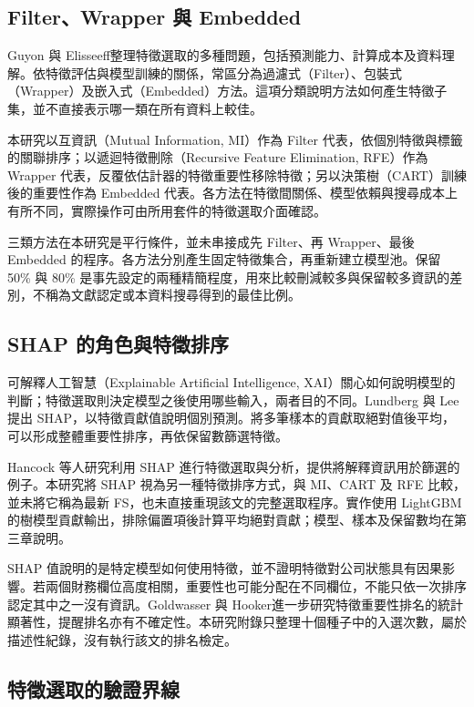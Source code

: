 \subsection{Filter、Wrapper 與 Embedded}

Guyon 與 Elisseeff\autocite{guyon2003selection}整理特徵選取的多種問題，包括預測能力、計算成本及資料理解。依特徵評估與模型訓練的關係，常區分為過濾式（Filter）、包裝式（Wrapper）及嵌入式（Embedded）方法。這項分類說明方法如何產生特徵子集，並不直接表示哪一類在所有資料上較佳。

本研究以互資訊（Mutual Information, MI）作為 Filter 代表，依個別特徵與標籤的關聯排序；以遞迴特徵刪除（Recursive Feature Elimination, RFE）作為 Wrapper 代表，反覆依估計器的特徵重要性移除特徵；另以決策樹（CART）訓練後的重要性作為 Embedded 代表。各方法在特徵間關係、模型依賴與搜尋成本上有所不同，實際操作可由所用套件的特徵選取介面確認\autocite{sklearn-fs-docs}。

三類方法在本研究是平行條件，並未串接成先 Filter、再 Wrapper、最後 Embedded 的程序。各方法分別產生固定特徵集合，再重新建立模型池。保留 50\% 與 80\% 是事先設定的兩種精簡程度，用來比較刪減較多與保留較多資訊的差別，不稱為文獻認定或本資料搜尋得到的最佳比例。

\subsection{SHAP 的角色與特徵排序}

可解釋人工智慧（Explainable Artificial Intelligence, XAI）關心如何說明模型的判斷；特徵選取則決定模型之後使用哪些輸入，兩者目的不同。Lundberg 與 Lee\autocite{lundberg2017shap}提出 SHAP，以特徵貢獻值說明個別預測。將多筆樣本的貢獻取絕對值後平均，可以形成整體重要性排序，再依保留數篩選特徵。

Hancock 等人\autocite{hancock2025shapfs}研究利用 SHAP 進行特徵選取與分析，提供將解釋資訊用於篩選的例子。本研究將 SHAP 視為另一種特徵排序方式，與 MI、CART 及 RFE 比較，並未將它稱為最新 FS，也未直接重現該文的完整選取程序。實作使用 LightGBM 的樹模型貢獻輸出，排除偏置項後計算平均絕對貢獻；模型、樣本及保留數均在第三章說明。

SHAP 值說明的是特定模型如何使用特徵，並不證明特徵對公司狀態具有因果影響。若兩個財務欄位高度相關，重要性也可能分配在不同欄位，不能只依一次排序認定其中之一沒有資訊。Goldwasser 與 Hooker\autocite{goldwasser2025rankings}進一步研究特徵重要性排名的統計顯著性，提醒排名亦有不確定性。本研究附錄只整理十個種子中的入選次數，屬於描述性紀錄，沒有執行該文的排名檢定。

\subsection{特徵選取的驗證界線}

